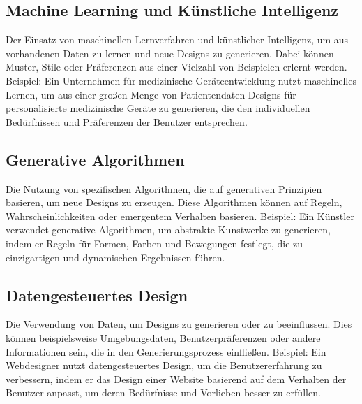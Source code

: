 \subsection*{Machine Learning und Künstliche Intelligenz}
Der Einsatz von maschinellen Lernverfahren und künstlicher Intelligenz, um aus vorhandenen Daten zu lernen und neue Designs zu generieren. Dabei können Muster, Stile oder Präferenzen aus einer Vielzahl von Beispielen erlernt werden. Beispiel: Ein Unternehmen für medizinische Geräteentwicklung nutzt maschinelles Lernen, um aus einer großen Menge von Patientendaten Designs für personalisierte medizinische Geräte zu generieren, die den individuellen Bedürfnissen und Präferenzen der Benutzer entsprechen.

\subsection*{Generative Algorithmen}
Die Nutzung von spezifischen Algorithmen, die auf generativen Prinzipien basieren, um neue Designs zu erzeugen. Diese Algorithmen können auf Regeln, Wahrscheinlichkeiten oder emergentem Verhalten basieren. Beispiel: Ein Künstler verwendet generative Algorithmen, um abstrakte Kunstwerke zu generieren, indem er Regeln für Formen, Farben und Bewegungen festlegt, die zu einzigartigen und dynamischen Ergebnissen führen.

\subsection*{Datengesteuertes Design}
Die Verwendung von Daten, um Designs zu generieren oder zu beeinflussen. Dies können beispielsweise Umgebungsdaten, Benutzerpräferenzen oder andere Informationen sein, die in den Generierungsprozess einfließen. Beispiel: Ein Webdesigner nutzt datengesteuertes Design, um die Benutzererfahrung zu verbessern, indem er das Design einer Website basierend auf dem Verhalten der Benutzer anpasst, um deren Bedürfnisse und Vorlieben besser zu erfüllen.